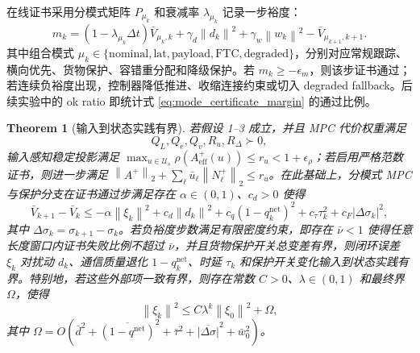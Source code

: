 \documentclass[twocolumn,3p,times,procedia]{elsarticle}
\newcommand{\norm}[1]{\left\lVert #1 \right\rVert}
\newtheorem{theorem}{Theorem}
\begin{document}
在线证书采用分模式矩阵 $P_{\mu_k}$ 和衰减率 $\lambda_{\mu_k}$ 记录一步裕度：
\begin{equation}
m_k=(1-\lambda_{\mu_k}\Delta t)\bar V_{\mu_k,k}
+\gamma_d\norm{d_k}^2+\gamma_w\norm{w_k}^2
-\bar V_{\mu_{k+1},k+1}.
\label{eq:mode_certificate_margin}
\end{equation}
其中组合模式 $\mu_k\in\{\mathrm{nominal},\mathrm{lat},\mathrm{payload},\mathrm{FTC},\mathrm{degraded}\}$，分别对应常规跟踪、横向优先、货物保护、容错重分配和降级保护。若 $m_k\ge -\epsilon_m$，则该步证书通过；若连续负裕度出现，控制器降低推进、收缩连接约束或切入 degraded fallback。后续实验中的 ok ratio 即统计式 \eqref{eq:mode_certificate_margin} 的通过比例。

\begin{theorem}[输入到状态实践有界]
若假设 1--3 成立，并且 MPC 代价权重满足
\begin{equation}
Q_L,Q_e,Q_v,R_u,R_\Delta\succ0,
\label{eq:positive_weights}
\end{equation}
输入感知稳定投影满足 $\max_{u\in\mathcal U_s}\rho(A_{\mathrm{eff}}^+(u))\le r_u<1+\epsilon_\rho$；若启用严格范数证书，则进一步满足 $\norm{A^+}_2+\sum_\ell \bar u_\ell\norm{N_\ell^+}_2\le r_u$。在此基础上，分模式 MPC 与保护分支在证书通过步满足存在 $\alpha\in(0,1)$、$c_d>0$ 使得
\begin{equation}
\bar V_{k+1}-\bar V_k\le -\alpha\norm{\xi_k}^2+c_d\norm{d_k}^2+c_q(1-q_k^{\mathrm{net}})^2+c_\tau\tau_k^2+c_F|\Delta\sigma_k|^2,
\label{eq:iss_difference}
\end{equation}
其中 $\Delta\sigma_k=\sigma_{k+1}-\sigma_k$。若负裕度步数满足有限密度约束，即存在 $\bar \nu<1$ 使得任意长度窗口内证书失败比例不超过 $\bar \nu$，并且货物保护开关总变差有界，则闭环误差 $\xi_k$ 对扰动 $d_k$、通信质量退化 $1-q_k^{\mathrm{net}}$、时延 $\tau_k$ 和保护开关变化输入到状态实践有界。特别地，若这些外部项一致有界，则存在常数 $C>0$、$\lambda\in(0,1)$ 和最终界 $\Omega$，使得
\begin{equation}
\norm{\xi_k}^2\le C\lambda^k\norm{\xi_0}^2+\Omega ,
\label{eq:uub_bound}
\end{equation}
其中 $\Omega=O(\bar d^2+\overline{(1-q^{\mathrm{net}})}^2+\bar\tau^2+\overline{|\Delta\sigma|}^2+\bar w_0^2)$。
\end{theorem}
\end{document}
